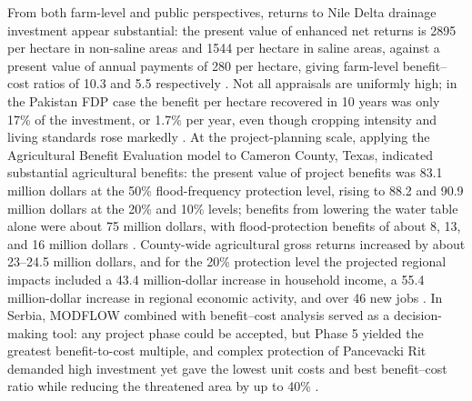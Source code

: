 \documentclass[11pt]{article}
\begin{document}
From both farm-level and public perspectives, returns to Nile Delta drainage investment appear substantial: the present value of enhanced net returns is 2895 per hectare in non-saline areas and 1544 per hectare in saline areas, against a present value of annual payments of 280 per hectare, giving farm-level benefit--cost ratios of 10.3 and 5.5 respectively \parencite{Wichelns2002}. Not all appraisals are uniformly high; in the Pakistan FDP case the benefit per hectare recovered in 10 years was only 17\% of the investment, or 1.7\% per year, even though cropping intensity and living standards rose markedly \parencite{Ghumman2011}. At the project-planning scale, applying the Agricultural Benefit Evaluation model to Cameron County, Texas, indicated substantial agricultural benefits: the present value of project benefits was 83.1 million dollars at the 50\% flood-frequency protection level, rising to 88.2 and 90.9 million dollars at the 20\% and 10\% levels; benefits from lowering the water table alone were about 75 million dollars, with flood-protection benefits of about 8, 13, and 16 million dollars \parencite{ROBINSON1992}. County-wide agricultural gross returns increased by about 23--24.5 million dollars, and for the 20\% protection level the projected regional impacts included a 43.4 million-dollar increase in household income, a 55.4 million-dollar increase in regional economic activity, and over 46 new jobs \parencite{ROBINSON1992}. In Serbia, MODFLOW combined with benefit--cost analysis served as a decision-making tool: any project phase could be accepted, but Phase 5 yielded the greatest benefit-to-cost multiple, and complex protection of Pancevacki Rit demanded high investment yet gave the lowest unit costs and best benefit--cost ratio while reducing the threatened area by up to 40\% \parencite{Bozic2014}.
\end{document}

